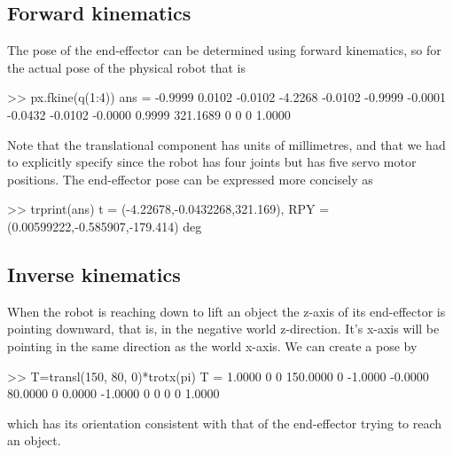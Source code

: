 \documentclass[11pt]{article}
\begin{document}
                    
\subsection{Forward kinematics}
The pose of the end-effector can be determined using forward kinematics, so for the actual pose of the physical robot
that is
\begin{Code}
>> px.fkine(q(1:4))
ans =
   -0.9999    0.0102   -0.0102   -4.2268
   -0.0102   -0.9999   -0.0001   -0.0432
   -0.0102   -0.0000    0.9999  321.1689
         0         0         0    1.0000
\end{Code}
Note that the translational component has units of millimetres, and that we had to explicitly specify  since the 
robot has four joints but  has five servo motor positions.
The end-effector pose can be expressed more concisely as
\begin{Code}
>> trprint(ans)
t = (-4.22678,-0.0432268,321.169), RPY = (0.00599222,-0.585907,-179.414) deg
\end{Code}


\subsection{Inverse kinematics}
When the robot is reaching down to lift an object the z-axis of its end-effector is pointing downward, that is, in the
negative world z-direction.  It's x-axis will be pointing in the same direction as the world x-axis.
We can create a pose by
\begin{Code}
>> T=transl(150, 80, 0)*trotx(pi)
T =
    1.0000         0         0  150.0000
         0   -1.0000   -0.0000   80.0000
         0    0.0000   -1.0000         0
         0         0         0    1.0000
\end{Code}
which has its orientation consistent with that of the end-effector trying to reach an object.
\end{document}

